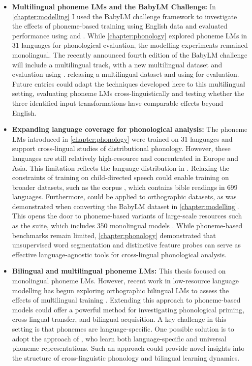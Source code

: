 \begin{itemize}
    \item \textbf{Multilingual phoneme LMs and the BabyLM Challenge:} In \cref{chapter:modelling} I used the BabyLM challenge framework to investigate the effects of phoneme-based training using English data and evaluated performance using \blimp and \glue. While \cref{chapter:phonology} explored phoneme LMs in 31 languages for phonological evaluation, the modelling experiments remained monolingual. The recently announced fourth edition of the BabyLM challenge will include a multilingual track, with a new multilingual dataset and evaluation using . releasing a multilingual dataset and using  for evaluation. Future entries could adapt the techniques developed here to this multilingual setting, evaluating phoneme LMs cross-linguistically and testing whether the three identified input transformations have comparable effects beyond English.
    \item \textbf{Expanding language coverage for phonological analysis:} The phoneme LMs introduced in \cref{chapter:phonology} were trained on 31 languages and support cross-lingual studies of distributional phonology. However, these languages are still relatively high-resource and concentrated in Europe and Asia. This limitation reflects the language distribution in \childes. Relaxing the constraints of training on child-directed speech could enable training on broader datasets, such as the  corpus \citep{8683536}, which contains bible readings in 699 languages. Furthermore, \gpp could be applied to orthographic datasets, as was demonstrated when converting the BabyLM dataset in \cref{chapter:modelling}. This opens the door to phoneme-based variants of large-scale resources such as the  suite, which includes 350 monolingual models \citep{chang2024goldfish}. While phoneme-based benchmarks remain limited, \cref{chapter:phonology} demonstrated that unsupervised word segmentation and distinctive feature probes can serve as effective language-agnostic tools for cross-lingual phonological analysis.
    \item \textbf{Bilingual and multilingual phoneme LMs:} This thesis focused on monolingual phoneme LMs. However, recent work in low-resource language modelling has begun exploring orthographic bilingual LMs to assess the effects of multilingual training \citep{arnett2025acquisition}. Extending this approach to phoneme-based models could offer a powerful method for investigating phonological priming, cross-lingual transfer, and bilingual acquisition. A key challenge in this setting is that phonemes are language-specific. One possible solution is to adopt the approach of \citet{li2020universal}, who learn both language-specific and universal phoneme representations. Such an approach could provide novel insights into the structure of cross-linguistic phonology and bilingual learning dynamics.

\end{itemize}
